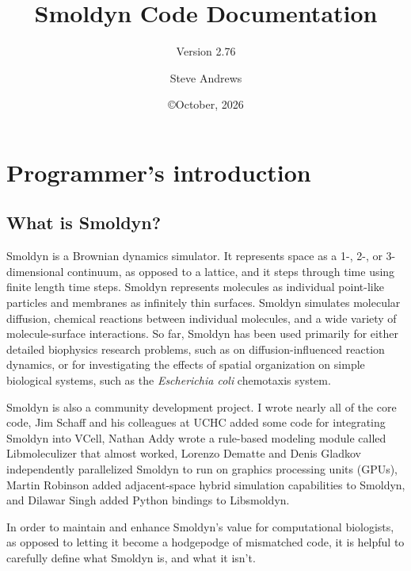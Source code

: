 \documentclass {scrbook}
\begin{document}

\title{Smoldyn Code Documentation} 
\subtitle{Version 2.76}
\date{\copyright October, 2026}
\author{Steve Andrews}
\maketitle

\tableofcontents


\chapter{Programmer's introduction}

\section{What is Smoldyn?}

Smoldyn is a Brownian dynamics simulator. It represents space as a 1-, 2-, or 3-dimensional continuum, as opposed to a lattice, and it steps through time using finite length time steps. Smoldyn represents molecules as individual point-like particles and membranes as infinitely thin surfaces. Smoldyn simulates molecular diffusion, chemical reactions between individual molecules, and a wide variety of molecule-surface interactions. So far, Smoldyn has been used primarily for either detailed biophysics research problems, such as on diffusion-influenced reaction dynamics, or for investigating the effects of spatial organization on simple biological systems, such as the \emph{Escherichia coli} chemotaxis system.

Smoldyn is also a community development project. I wrote nearly all of the core code, Jim Schaff and his colleagues at UCHC added some code for integrating Smoldyn into VCell, Nathan Addy wrote a rule-based modeling module called Libmoleculizer that almost worked, Lorenzo Dematte and Denis Gladkov independently parallelized Smoldyn to run on graphics processing units (GPUs), Martin Robinson added adjacent-space hybrid simulation capabilities to Smoldyn, and Dilawar Singh added Python bindings to Libsmoldyn.

In order to maintain and enhance Smoldyn's value for computational biologists, as opposed to letting it become a hodgepodge of mismatched code, it is helpful to carefully define what Smoldyn is, and what it isn't.
\end{document}
